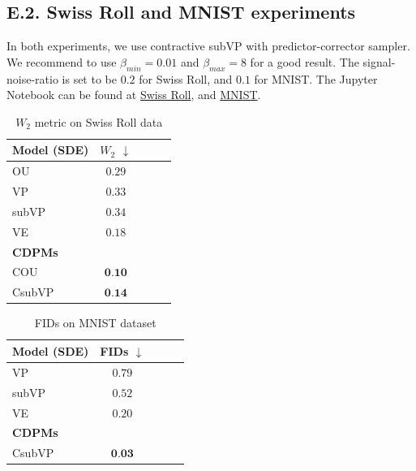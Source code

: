 \documentclass[letterpaper,11pt,reqno]{amsart}
\numberwithin{equation}{section}
\begin{document}
\subsection*{E.2. Swiss Roll and MNIST experiments}
In both experiments, 
we use contractive subVP with predictor-corrector sampler. 
We recommend to use $\beta_{min}=0.01$ and $\beta_{max}=8$ for a good result. The signal-noise-ratio is set to be $0.2$ for Swiss Roll,
and $0.1$ for MNIST. 
The Jupyter Notebook can be found at \href{https://colab.research.google.com/drive/1lQhUnIYR9VJIVhlD8t0p73JXKKe6ra09?usp=sharing}{Swiss Roll}, 
and \href{https://colab.research.google.com/drive/1g_sE-E1S8_FVYiqA-VkzFROz4bFXNByZ?usp=sharing}{MNIST}.\\

\begin{table}[!htbp]
\centering
\begin{tabular}{l c c c c}
    \toprule
        Model (SDE) & $W_2$  $\downarrow$\\
        \midrule
        OU ~& $0.29$ \\
        VP~\cite{Song20}& $0.33$\\
        subVP~\cite{Song20}& $0.34$\\
        VE~\cite{Song20}& $0.18$\\
        \midrule
        \textbf{CDPMs}\\
        \midrule
         COU & $\textbf{0.10}$\\
         CsubVP & $\textbf{0.14}$\\
         \bottomrule
\end{tabular}
\caption{$W_2$ metric on Swiss Roll data}
\end{table}

\begin{table}[!htbp]
\centering
\begin{tabular}{l c c c c}
    \toprule
        Model (SDE) & FIDs  $\downarrow$\\
        \midrule
        VP~\cite{Song20}& $0.79$\\
        subVP~\cite{Song20}& $0.52$\\
        VE~\cite{Song20}& $0.20$\\
        \midrule
        \textbf{CDPMs}\\
        \midrule
         CsubVP & $\textbf{0.03}$\\
         \bottomrule
\end{tabular}
\caption{FIDs on MNIST dataset}
\end{table}
\end{document}
